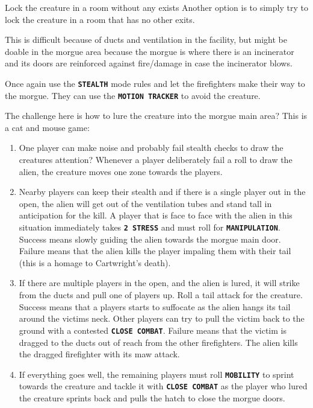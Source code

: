 \newsect

\begin{rpg-commentbox}{Lock the creature in a room without any exists}
   Another option is to simply try to lock the creature in a room that has no other exits. 
   
   This is difficult because of ducts and ventilation in the facility, but might be doable in the morgue area because the morgue is where there is an incinerator and its doors are reinforced against fire/damage in case the incinerator blows. 

   Once again 
   use the \texttt{\textbf{STEALTH}} mode rules and let the firefighters make their way to the morgue.
   They can use the \texttt{\textbf{MOTION TRACKER}} to avoid the creature.

   The challenge here is how to lure the creature into the morgue main area? This is a cat and mouse game:

   \begin{enumerate}
      \item One player can make noise and probably fail stealth checks to draw the creatures attention? Whenever a player deliberately fail a roll to draw the alien, the creature moves one zone towards the players.

      \item Nearby players can keep their stealth and if there is a single player out in the open, the alien will get out of the ventilation tubes and stand tall in anticipation for the kill. A player that is face to face with the alien in this situation immediately takes \texttt{\textbf{2 STRESS}}
      and must roll for \texttt{\textbf{MANIPULATION}}. Success means slowly guiding the alien towards the morgue main door. Failure means that the alien kills the player impaling them with their tail (this is a homage to Cartwright's death).
      
      \item If there are multiple players in the open, and the alien is lured, it will strike from the ducts and pull one of players up. Roll a tail attack for the creature. Success means that a players starts to suffocate as the alien hangs its tail around the victims neck. Other players can try to pull the victim back to the ground with a contested \texttt{\textbf{CLOSE COMBAT}}. Failure means that the victim is dragged to the ducts out of reach from the other firefighters. The alien kills the dragged firefighter with its maw attack. 

      \item If everything goes well, the remaining players must roll \texttt{\textbf{MOBILITY}} to sprint towards the creature and tackle it with \texttt{\textbf{CLOSE COMBAT}} as the player who lured the creature sprints back and pulls the hatch to close the morgue doors. 
      
   \end{enumerate}
   
\end{rpg-commentbox}

